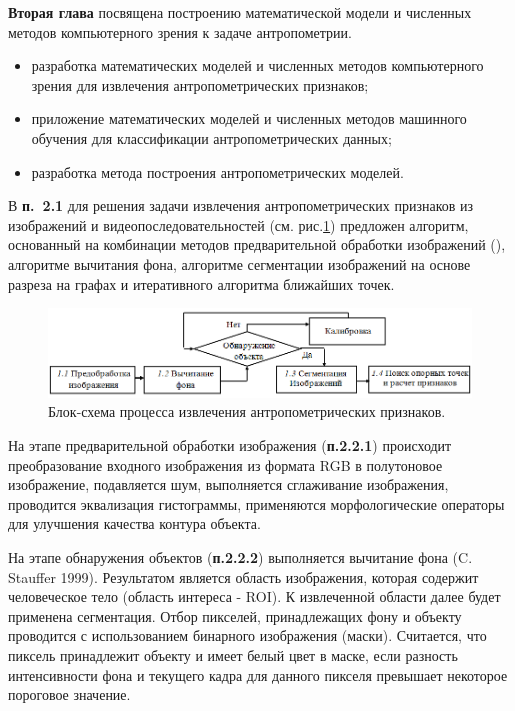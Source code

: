 \textbf{Вторая глава} посвящена построению математической модели и численных методов компьютерного зрения к задаче антропометрии. 
\begin{itemize}
	\item разработка математических моделей и численных методов компьютерного зрения для извлечения антропометрических признаков;
	\item приложение математических моделей и численных методов машинного обучения для классификации антропометрических данных;
	\item разработка метода построения антропометрических моделей.
\end{itemize}

В \textbf{п.~2.1} для решения задачи извлечения антропометрических признаков из изображений и видеопоследовательностей (см. рис.\ref{img53}) предложен алгоритм, основанный на комбинации  методов предварительной обработки изображений (), алгоритме вычитания фона, алгоритме сегментации изображений на основе разреза на графах и итеративного алгоритма ближайших точек.
\begin{figure}[ht!]
\centering
\includegraphics [width=1\linewidth] {images/h53.png}
\begin{center}
\caption{Блок-схема процесса извлечения антропометрических признаков.} \label{img53}
\end{center}
\end{figure}

На этапе предварительной обработки изображения (\textbf{п.2.2.1}) происходит преобразование входного изображения из формата RGB в полутоновое изображение, подавляется шум, выполняется сглаживание изображения, проводится эквализация гистограммы, применяются морфологические операторы для улучшения качества контура объекта.

На этапе обнаружения объектов (\textbf{п.2.2.2}) выполняется вычитание фона (C. Stauffer 1999). Результатом является область изображения, которая содержит человеческое тело (область интереса - ROI). К извлеченной области далее будет применена сегментация. Отбор пикселей, принадлежащих фону и объекту проводится с использованием бинарного изображения (маски). Считается, что пиксель принадлежит объекту и имеет белый цвет в маске, если разность интенсивности фона и текущего кадра для данного пикселя превышает некоторое пороговое значение.

